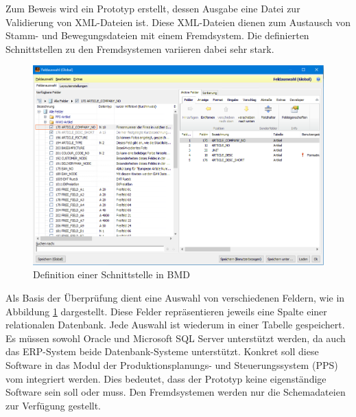 Zum Beweis wird ein Prototyp erstellt, dessen Aus\-gabe eine Datei zur Validierung von XML-\-Dateien ist. Diese XML-Dateien dienen zum Austausch von Stamm-\- und Bewegungsdateien mit einem Fremd\-system. 
Die definierten Schnittstellen zu den Fremdsystemen variieren dabei sehr stark.

\begin{figure}
    \centering
    \includegraphics[width=.95\textwidth]{images/Feldauswahl.png}
    \caption{Definition einer Schnittstelle in BMD}
    \label{fig:Feldauswahl}
\end{figure}

Als Basis der Überprüfung dient eine Auswahl von 
verschiedenen Feldern, wie in Abbildung \ref{fig:Feldauswahl} dargestellt. 
Diese Felder repräsentieren jeweils eine Spalte einer relationalen Datenbank. 
Jede Auswahl ist wiederum in einer Tabelle gespeichert. 
Es müssen sowohl Oracle und Microsoft SQL Server unterstützt werden, da auch das ERP-System beide Datenbank-Systeme unterstützt. 
Konkret soll diese Software in das Modul der Produktionsplanungs- und Steuerungssystem (PPS) vom \BMD integriert werden. 
Dies bedeutet, dass der Prototyp keine eigen\-ständige Software sein soll oder muss. 
Den Fremdsystemen werden nur die Schemadateien zur Verfügung gestellt.

